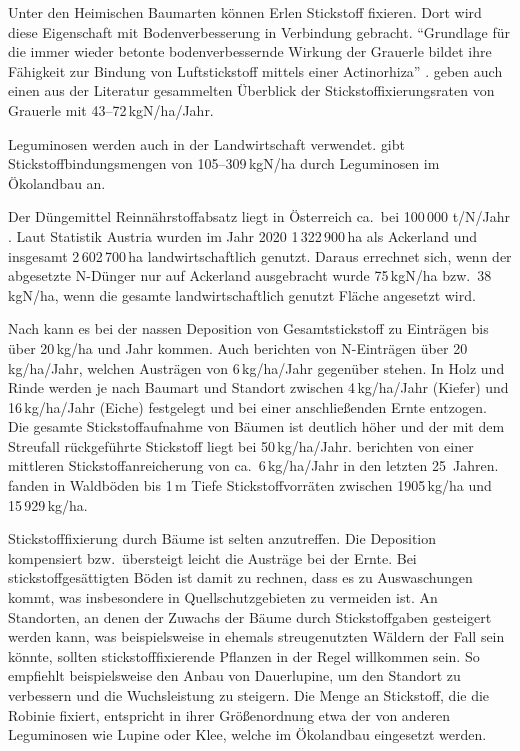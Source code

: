 \documentclass[twocolumn]{scrartcl}
\begin{document}
Unter den Heimischen Baumarten können Erlen Stickstoff fixieren. Dort
wird diese Eigenschaft mit Bodenverbesserung in Verbindung
gebracht. \enquote{Grundlage für die immer wieder betonte bodenverbessernde
Wirkung der Grauerle bildet ihre Fähigkeit zur Bindung von
Luftstickstoff mittels einer Actinorhiza}
\citep{schuett2014alnusIncarna}. \cite{schuett2014alnusIncarna} geben
auch einen aus der Literatur gesammelten Überblick der
Stickstoffixierungsraten von Grauerle mit 43--72\,kgN/ha/Jahr.

Leguminosen werden auch in der Landwirtschaft verwendet.
\cite{kolbe2008stickstoff} gibt Stickstoffbindungsmengen von
105--309\,kgN/ha durch Leguminosen im Ökolandbau an.

Der Düngemittel Reinnährstoffabsatz liegt in Österreich ca.\ bei 100\,000
t/N/Jahr \citep{ama2024duengemittel}. Laut Statistik Austria wurden im Jahr 2020
1\,322\,900\,ha als Ackerland und insgesamt 2\,602\,700\,ha landwirtschaftlich
genutzt. Daraus errechnet sich, wenn der abgesetzte N-Dünger nur auf Ackerland
ausgebracht wurde 75\,kgN/ha bzw.\ 38\,kgN/ha, wenn die gesamte
landwirtschaftlich genutzt Fläche angesetzt wird.

Nach \cite{uba1998deposition} kann es bei der nassen Deposition von
Gesamtstickstoff zu Einträgen bis über 20\,kg/ha und Jahr kommen. Auch
\cite{raspe2018stickstoff} berichten von N-Einträgen über
20\,kg/ha/Jahr, welchen Austrägen von 6\,kg/ha/Jahr gegenüber
stehen. In Holz und Rinde werden je nach Baumart und Standort zwischen
4\,kg/ha/Jahr (Kiefer) und 16\,kg/ha/Jahr (Eiche) festgelegt und bei
einer anschließenden Ernte entzogen. Die gesamte Stickstoffaufnahme
von Bäumen ist deutlich höher und der mit dem Streufall rückgeführte
Stickstoff liegt bei 50\,kg/ha/Jahr. \cite{raspe2018stickstoff}
berichten von einer mittleren Stickstoffanreicherung von
ca.\ 6\,kg/ha/Jahr in den letzten 25~Jahren.
\cite{emberger1965stickstoff} fanden in Waldböden bis 1\,m Tiefe
Stickstoffvorräten zwischen 1905\,kg/ha und 15\,929\,kg/ha.

Stickstofffixierung durch Bäume ist selten anzutreffen.
Die Deposition kompensiert bzw.\ übersteigt leicht die Austräge bei
der Ernte. Bei stickstoffgesättigten Böden ist damit zu rechnen, dass
es zu Auswaschungen kommt, was insbesondere in Quellschutzgebieten zu
vermeiden ist. An Standorten, an denen der Zuwachs der Bäume durch
Stickstoffgaben gesteigert werden kann, was beispielsweise in ehemals
streugenutzten Wäldern der Fall sein könnte, sollten
stickstofffixierende Pflanzen in der Regel willkommen sein. So
empfiehlt beispielsweise \cite{wiedemann1951ertragskunde} den Anbau
von Dauerlupine, um den Standort zu verbessern und die Wuchsleistung zu
steigern. Die Menge an Stickstoff, die die Robinie fixiert, entspricht
in ihrer Größenordnung etwa der von anderen Leguminosen wie Lupine
oder Klee, welche im Ökolandbau eingesetzt werden.
\end{document}
